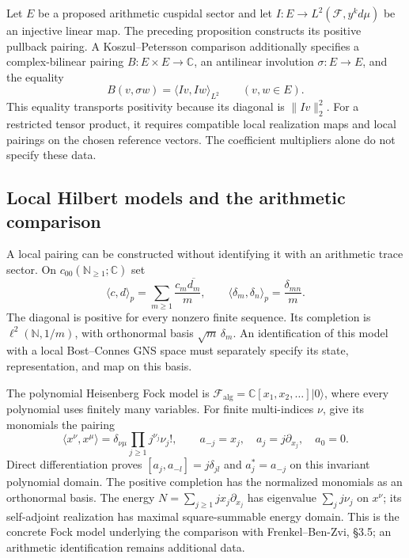 \begin{remark}
\label{v4-arith:w5-a:rem:restricted-tensor}
Let \(E\) be a proposed arithmetic cuspidal sector and let
\(I:E\to L^2(\mathcal F,y^k d\mu)\) be an injective linear map.
The preceding proposition constructs its positive pullback pairing.
A Koszul--Petersson comparison additionally specifies a complex-bilinear
pairing \(B:E\times E\to\mathbb C\), an antilinear involution
\(\sigma:E\to E\), and the equality
\[
 B(v,\sigma w)=\langle Iv,Iw\rangle_{L^2}
 \qquad(v,w\in E).
\]
This equality transports positivity because its diagonal is
\(\|Iv\|_2^2\). For a restricted tensor product, it requires compatible
local realization maps and local pairings on the chosen reference
vectors. The coefficient multipliers alone do not specify these data.
\end{remark}

\subsection{Local Hilbert models and the arithmetic comparison}
\label{v4-arith:pres57:local-models}

A local pairing can be constructed without identifying it with an
arithmetic trace sector. On $c_{00}(\mathbb N_{\ge1};\mathbb C)$ set
\[
 \langle c,d\rangle_p=\sum_{m\ge1}\frac{c_m\overline{d_m}}m,
 \qquad \langle\delta_m,\delta_n\rangle_p=\frac{\delta_{mn}}m.
\]
The diagonal is positive for every nonzero finite sequence. Its
completion is $\ell^2(\mathbb N,1/m)$, with orthonormal basis
$\sqrt m\,\delta_m$. An identification of this model with a local
Bost--Connes GNS space must separately specify its state, representation,
and map on this basis.

The polynomial Heisenberg Fock model is
$\mathcal F_{\mathrm{alg}}=\mathbb C[x_1,x_2,\ldots]|0\rangle$,
where every polynomial uses finitely many variables. For finite
multi-indices $\nu$, give its monomials the pairing
\[
 \langle x^\nu,x^\mu\rangle
 =\delta_{\nu\mu}\prod_{j\ge1}j^{\nu_j}\nu_j!,\qquad
 a_{-j}=x_j,\quad a_j=j\partial_{x_j},\quad a_0=0.
\]
Direct differentiation proves $[a_j,a_{-l}]=j\delta_{jl}$ and
$a_j^*=a_{-j}$ on this invariant polynomial domain.
The positive completion has the normalized monomials as an
orthonormal basis. The energy $N=\sum_{j\ge1}j x_j\partial_{x_j}$
has eigenvalue $\sum_jj\nu_j$ on $x^\nu$; its self-adjoint
realization has maximal square-summable energy domain.
This is the concrete Fock model underlying the comparison with
Frenkel--Ben-Zvi, \S3.5; an arithmetic identification remains additional data.


